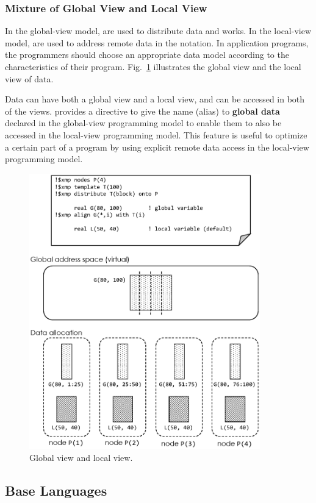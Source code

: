 \subsubsection{Mixture of Global View and Local View}

In the global-view model, {\nodes} are used to distribute data and works. In the
local-view model, {\nodes} are used to address remote data in the {\coarray}
notation.
%
In application programs,
the programmers should choose an appropriate data model according to the
characteristics of their program. Fig.~\ref{fig4} illustrates the global view
and the local view of data.

Data can have both a global view and a local view, and can be accessed
in both of the views. {\XMP} provides a directive to give the {\local} name
(alias) to {\bf global data} declared in the global-view programming model
to enable them to also be accessed in the local-view programming
model. This feature is useful to optimize a certain part of a program
by using explicit remote data access in the local-view programming
model.

\begin{figure}
  \centering
  \includegraphics[width=10cm]{figs/Fig4.eps}
  \caption{Global view and local view.}
  \label{fig4}
\end{figure}


\subsection{Base Languages}

